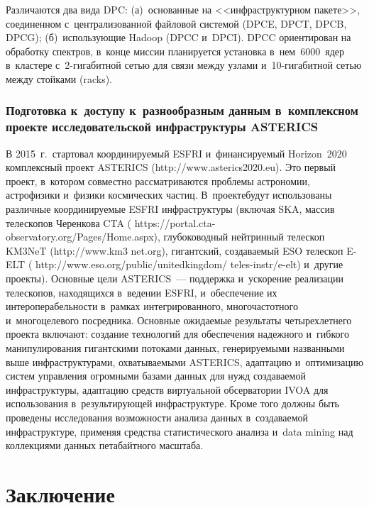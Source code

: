 \begin{multicols}{2}
  Различаются два вида DPC: (а)~основанные на <<инфраструктурном пакете>>, 
соединенном с~централизованной файловой системой (DPCE, DPCT, DPCB, DPCG); 
(б)~использующие Hadoop (DPCC и~DPCI). DPCC ориентирован на обработку спектров, 
в~конце миссии планируется установка в~нем~6000~ядер в~кластере с~2-ги\-га\-бит\-ной 
сетью для связи между узлами и~10-ги\-га\-бит\-ной сетью между стойками (racks).
  
\subsubsection{Подготовка к~доступу к~разнообразным данным в~комплексном 
проекте исследовательской инфраструктуры ASTERICS}

  В 2015~г.\ стартовал координируемый ESFRI и~финансируемый Horizon~2020 
комплексный проект ASTERICS ({\sf http://www.asterics2020.eu}). Это первый проект, 
в~котором совместно рас\-смат\-ри\-ва\-ют\-ся проблемы астрономии, астрофизики и~физики 
космических частиц. В~проекте\linebreak будут использованы различные координируемые ESFRI 
инфраструктуры (включая SKA, массив телескопов Черенкова CTA ({\sf  
https://portal.cta-obs\linebreak ervatory.org/Pages/Home.aspx}), 
глубоководный\linebreak
 нейт\-рин\-ный телескоп 
KM3NeT ({\sf http://www.km3 net.org}), гигантский, создаваемый ESO телескоп \mbox{E-ELT} ({\sf 
http://www.eso.org/public/unitedkingdom/ teles-instr/e-elt}) и~другие проекты). Основные цели 
ASTERICS~--- поддержка и~ускорение реализации телескопов, находящихся в~ведении 
ESFRI, и~обеспечение их интероперабельности в~рамках интегрированного, 
многочастотного и~многоцелевого посредника. Основные ожидаемые результаты 
четырехлетнего проекта включают: создание технологий для обеспечения надежного 
и~гибкого манипулирования гигантскими потоками данных, генерируемыми названными 
выше инфраструктурами, охватываемыми ASTERICS, адап\-та\-цию и~оптимизацию систем 
управления огромными базами данных для нужд создаваемой инфраструктуры, адап\-та\-цию 
средств виртуальной обсерватории IVOA для использования в~результирующей 
инфраструктуре. Кроме того должны быть проведены исследования возможности анализа 
данных в~создаваемой инфраструктуре, применяя средства статистического анализа и~data 
mining над коллекциями данных петабайтного масштаба.

\section{Заключение}


\end{multicols}

